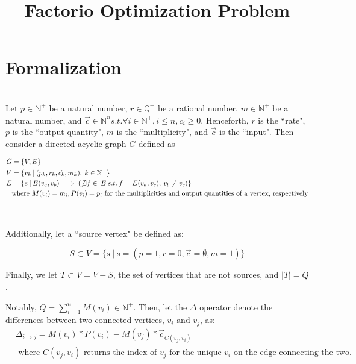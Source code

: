\documentclass{article}
\title{Factorio Optimization Problem}
\begin{document}
\maketitle

\section{Formalization}
\\


\indent Let $p \in \mathbb{N}^+$ be a natural number, $r \in \mathbb{Q}^+$ be a rational number, $m \in \mathbb{N}^+$ be a natural number, and $\vec{c} \in \mathbb{N}^n s.t. \forall i \in \mathbb{N}^+, i \leq n, c_i \geq 0 $. Henceforth, $r$ is the ``rate", $p$ is the ``output quantity", $m$ is the ``multiplicity", and $\vec{c}$ is the ``input". Then consider a directed acyclic graph $G$ defined as

\begin{align*}
G &=  \{V, E\}\\
 V &= \{v_k \: | \: (p_k, r_k, \vec{c}_k, m_k), \: k \in \mathbb{N}^+\}\\
 E &= \{e \: | \: E(v_a, v_b) \implies (\not \exists f \in \:E \: s.t.\: f = E(v_a, v_c), \: v_b \neq v_c)\}\\
 & \text{where } M(v_i) = m_i, P(v_i) = p_i \text{ for the multiplicities and output quantities of a vertex, respectively} \end{align*}

\\\medskip

Additionally, let a ``source vertex" be defined as:

\[
S \subset V = \{s \: | \: s = (p=1, r = 0, \vec{c} = \emptyset, m = 1)\}
\]
\medskip

Finally, we let $T \subset V = V - S$, the set of vertices that are not sources, and $|T| = Q$. 

Notably, $Q = \sum\limits_{i=1}^n M(v_i) \in \mathbb{N}^+$. Then, let the $\Delta$ operator denote the differences between two connected vertices, $v_i \text{ and } v_j$, as:
\begin{align*}
&\Delta_{i\rightarrow j} = M(v_i)*P(v_i) - M(v_j)*\vec{c}_{C(v_j, v_i)}\\
&\text{ where } C(v_j, v_i) \text{ returns the index of } v_j \text{ for the unique } v_i \text{ on the edge connecting the two.}
\end{align*}
\end{document}
